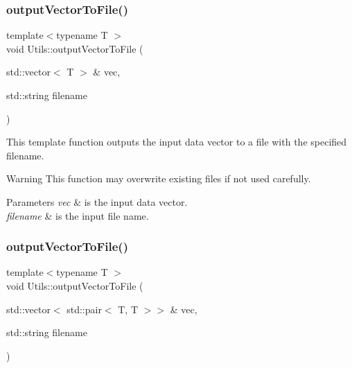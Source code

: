\subsubsection{\texorpdfstring{output\+Vector\+To\+File()}{outputVectorToFile()}\hspace{0.1cm}{\footnotesize\ttfamily [1/2]}}
{\footnotesize\ttfamily template$<$typename T $>$ \\
void Utils\+::output\+Vector\+To\+File (\begin{DoxyParamCaption}\item[{std\+::vector$<$ T $>$ \&}]{vec,  }\item[{std\+::string}]{filename }\end{DoxyParamCaption})}



This template function outputs the input data vector to a file with the specified filename. 

\begin{DoxyWarning}{Warning}
This function may overwrite existing files if not used carefully. 
\end{DoxyWarning}

\begin{DoxyParams}{Parameters}
{\em vec} & is the input data vector. \\
\hline
{\em filename} & is the input file name. \\
\hline
\end{DoxyParams}
\mbox{\label{namespace_utils_a652ab00e72bce852c2b9798ff3e1a60b}} 
\subsubsection{\texorpdfstring{output\+Vector\+To\+File()}{outputVectorToFile()}\hspace{0.1cm}{\footnotesize\ttfamily [2/2]}}
{\footnotesize\ttfamily template$<$typename T $>$ \\
void Utils\+::output\+Vector\+To\+File (\begin{DoxyParamCaption}\item[{std\+::vector$<$ std\+::pair$<$ T, T $>$$>$ \&}]{vec,  }\item[{std\+::string}]{filename }\end{DoxyParamCaption})}



